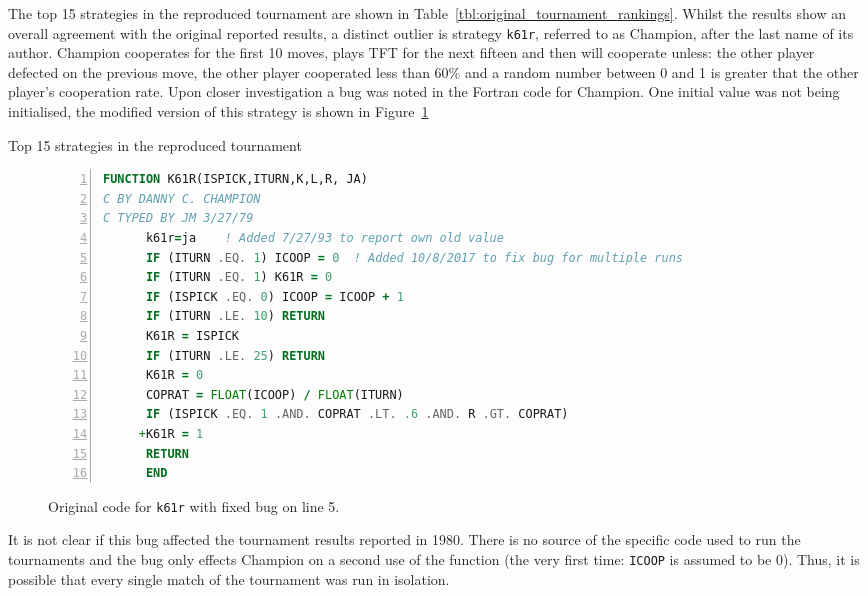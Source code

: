 \documentclass{article}
\begin{document}
The top 15 strategies in the reproduced tournament are shown in
Table~\ref{tbl:original_tournament_rankings}.
Whilst the results show an overall agreement with the original reported results,
a distinct outlier is strategy \texttt{k61r}, referred to as Champion, after the last name
of its author.  Champion cooperates for the first 10
moves, plays TFT for the next fifteen and then will cooperate
unless: the other player defected on the previous move, the
other player cooperated less than 60\% and a random number between
0 and 1 is greater that the other player's cooperation rate.
Upon closer investigation a bug was noted in the Fortran code for
Champion. One initial value was not being initialised, the modified version
of this strategy is shown in Figure~\ref{fig:k61r}

\begin{table}[!hbtp]
        \centering
        
        \caption{Top 15 strategies in the reproduced tournament}
        \label{tbl:original_tournament_rankings}
\end{table}

\begin{figure}[!hbtp]
    \begin{center}
        \begin{lstlisting}[language=Fortran,
                           basicstyle=\ttfamily,
                           frame=single,
                           keywordstyle=\color{red},
                           numbers=left,
                           commentstyle=\color{green}]
      FUNCTION K61R(ISPICK,ITURN,K,L,R, JA)
C BY DANNY C. CHAMPION
C TYPED BY JM 3/27/79
      k61r=ja    ! Added 7/27/93 to report own old value
      IF (ITURN .EQ. 1) ICOOP = 0  ! Added 10/8/2017 to fix bug for multiple runs
      IF (ITURN .EQ. 1) K61R = 0
      IF (ISPICK .EQ. 0) ICOOP = ICOOP + 1
      IF (ITURN .LE. 10) RETURN
      K61R = ISPICK
      IF (ITURN .LE. 25) RETURN
      K61R = 0
      COPRAT = FLOAT(ICOOP) / FLOAT(ITURN)
      IF (ISPICK .EQ. 1 .AND. COPRAT .LT. .6 .AND. R .GT. COPRAT)
     +K61R = 1
      RETURN
      END
        \end{lstlisting}
        \caption{Original code for \texttt{k61r} with fixed bug on line 5.}
        \label{fig:k61r}
    \end{center}
\end{figure}

It is not clear if this bug affected the tournament results reported in 1980.
There is no source of the specific code used to run the tournaments and
the bug only effects Champion on a second use of the function (the very
first time: \texttt{ICOOP} is assumed to be 0). Thus, it is possible that every
single match of the tournament was run in isolation.
\end{document}
